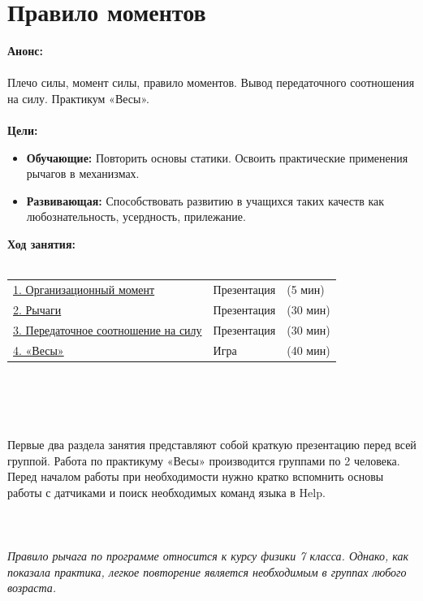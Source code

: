 \chapter{Правило моментов}
{\bfseries Анонс:}\\\\
Плечо силы, момент силы, правило моментов. Вывод передаточного соотношения на силу. Практикум «Весы».\\\\
{\bfseries Цели:}
\begin{itemize}
	\item{}{\bfseries Обучающие:} Повторить основы статики. Освоить практические применения рычагов в механизмах.
	\item{}{\bfseries Развивающая:} Способствовать развитию в учащихся таких качеств как любознательность, усердность, прилежание.\\
\end{itemize}	
{\bfseries Ход занятия:}\\\\
\begin{tabular}[h!]{lll}
	{\hyperlink{lesson20x1}{1. Организационный момент}}&{Презентация}&{(5 мин)}\\
	{\hyperlink{lesson20x2}{2. Рычаги}}&{Презентация}&{(30 мин)}\\
	{\hyperlink{lesson20x3}{3. Передаточное соотношение на силу}}&{Презентация}&{(30 мин)}\\
	{\hyperlink{lesson20x4}{4. «Весы»}}&{Игра}&{(40 мин)}\\
\end{tabular}\\\\

{\hypertarget{lesson20x1}{}}\\\\

Первые два раздела занятия представляют собой краткую презентацию перед всей группой. Работа по практикуму «Весы» производится группами по 2 человека. Перед началом работы при необходимости нужно кратко вспомнить основы работы с датчиками и поиск необходимых команд языка в Help.\\\\
\clearpage
{\hypertarget{lesson20x2}{}}\\\\	

{\slshape Правило рычага по программе относится к курсу физики 7 класса. Однако, как показала практика, легкое повторение является необходимым в группах любого возраста.}

